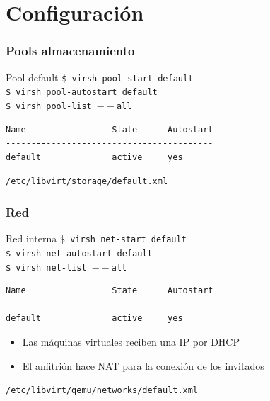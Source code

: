 \documentclass{beamer}
\begin{document}
\section{Configuración}

\begin{frame}[fragile]
  \frametitle{Pools almacenamiento}
  \begin{block}{Pool default}
    \texttt{\$ virsh pool-start default} \\
    \texttt{\$ virsh pool-autostart default} \\
    \medskip
    \texttt{\$ virsh pool-list $--$all} \\
    \small{\begin{verbatim}
Name                 State      Autostart 
----------------------------------------- 
default              active     yes
    \end{verbatim}}
  \end{block}
  \begin{center}
    \texttt{/etc/libvirt/storage/default.xml}
  \end{center}
\end{frame}

\begin{frame}[fragile]
  \frametitle{Red}
  \begin{block}{Red interna}
    \texttt{\$ virsh net-start default} \\
    \texttt{\$ virsh net-autostart default} \\
    \medskip
    \texttt{\$ virsh net-list $--$all} \\
    \small{\begin{verbatim}
Name                 State      Autostart
-----------------------------------------
default              active     yes
    \end{verbatim}}
  \end{block}
  \bigskip
  \begin{itemize}
    \item Las máquinas virtuales reciben una IP por DHCP
    \item El anfitrión hace NAT para la conexión de los invitados
  \end{itemize}
  \begin{center}
    \texttt{/etc/libvirt/qemu/networks/default.xml}
  \end{center}
\end{frame}
\end{document}
